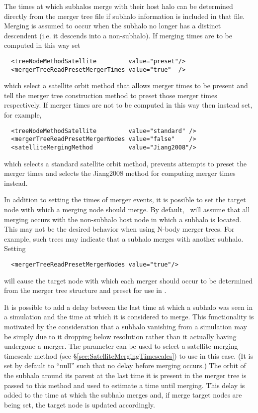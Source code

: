 The times at which subhalos merge with their host halo can be determined directly from the merger tree file if subhalo information is included in that file. Merging is assumed to occur when the subhalo no longer has a distinct descendent (i.e. it descends into a non-subhalo). If merging times are to be computed in this way set
\begin{verbatim}
  <treeNodeMethodSatellite         value="preset"/>
  <mergerTreeReadPresetMergerTimes value="true"  />
\end{verbatim}
which select a satellite orbit method that allows merger times to be present and tell the merger tree construction method to preset those merger times respectively. If merger times are not to be computed in this way then instead set, for example,
\begin{verbatim}
  <treeNodeMethodSatellite         value="standard" />
  <mergerTreeReadPresetMergerNodes value="false"    />
  <satelliteMergingMethod          value="Jiang2008"/>
\end{verbatim}
which selects a standard satellite orbit method, prevents attempts to preset the merger times and selects the {\normalfont \ttfamily Jiang2008} method for computing merger times instead.

In addition to setting the times of merger events, it is possible to set the target node with which a merging node should merge. By default, \glc\ will assume that all merging occurs with the non-subhalo host node in which a subhalo is located. This may not be the desired behavior when using N-body merger trees. For example, such trees may indicate that a subhalo merges with another subhalo. Setting
\begin{verbatim}
  <mergerTreeReadPresetMergerNodes value="true"/>
\end{verbatim}
will cause the target node with which each merger should occur to be determined from the merger tree structure and preset for use in \glc.

It is possible to add a delay between the last time at which a subhalo was seen in a simulation and the time at which it is considered to merge. This functionality is motivated by the consideration that a subhalo vanishing from a simulation may be simply due to it dropping below resolution rather than it actually having undergone a merger. The parameter {\normalfont \ttfamily [mergerTreeReadSubresolutionMergingMethod]} can be used to select a satellite merging timescale method (see \S\ref{sec:SatelliteMergingTimescales}) to use in this case. (It is set by default to ``{\normalfont \ttfamily null}'' such that no delay before merging occurs.) The orbit of the subhalo around its parent at the last time it is present in the merger tree is passed to this method and used to estimate a time until merging. This delay is added to the time at which the subhalo merges and, if merge target nodes are being set, the target node is updated accordingly.

